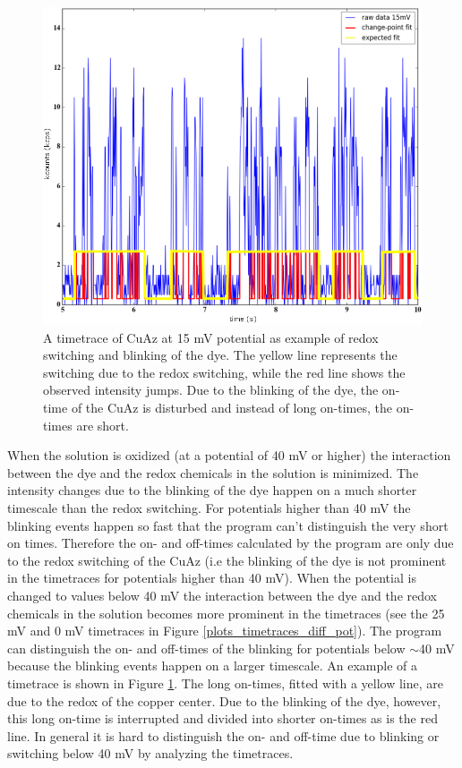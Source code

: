 \documentclass[twoside,single]{lion-msc}
\begin{document}
\begin{figure}[ht!]
\centering
\includegraphics[width=\textwidth]{expected_fits}
\caption{A timetrace of CuAz at 15 mV potential as example of redox switching and blinking of the dye. The yellow line represents the switching due to the redox switching, while the red line shows the observed intensity jumps. Due to the blinking of the dye, the on-time of the CuAz is disturbed and instead of long on-times, the on-times are short.}
\label{expected_fit}
\end{figure}
When the solution is oxidized (at a potential of 40 mV or higher) the interaction between the dye and the redox chemicals in the solution is minimized. The intensity changes due to the blinking of the dye happen on a much shorter timescale than the redox switching. For potentials higher than 40 mV the blinking events happen so fast that the program can't distinguish the very short on times. Therefore the on- and off-times calculated by the program are only due to the redox switching of the CuAz (i.e the blinking of the dye is not prominent in the timetraces for potentials higher than 40 mV). When the potential is changed to values below 40 mV the interaction between the dye and the redox chemicals in the solution becomes more prominent in the timetraces (see the 25 mV and 0 mV timetraces in Figure \ref{plots_timetraces_diff_pot}). The program can distinguish the on- and off-times of the blinking for potentials below $\sim$40 mV because the blinking events happen on a larger timescale. An example of a timetrace is shown in Figure \ref{expected_fit}. The long on-times, fitted with a yellow line, are due to the redox of the copper center. Due to the blinking of the dye, however, this long on-time is interrupted and divided into shorter on-times as is the red line. In general it is hard to distinguish the on- and off-time due to blinking or switching below 40 mV by analyzing the timetraces.  
\end{document}
